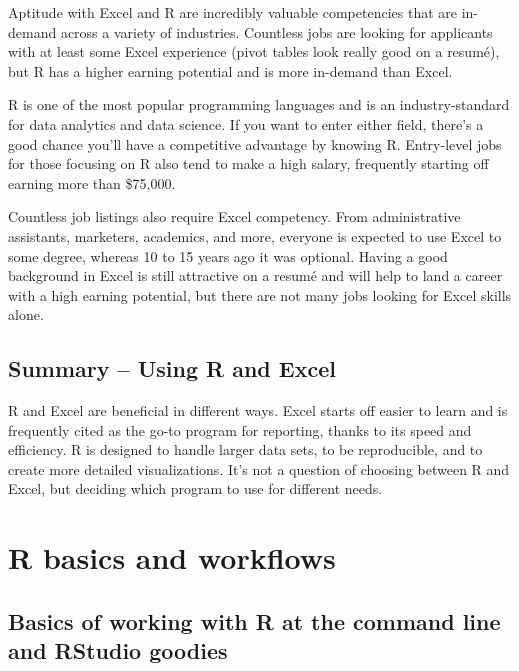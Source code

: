 \documentclass[
]{book}
\begin{document}
Aptitude with Excel and R are incredibly valuable competencies that are in-demand across a variety of industries. Countless jobs are looking for applicants with at least some Excel experience (pivot tables look really good on a resumé), but R has a higher earning potential and is more in-demand than Excel.

R is one of the most popular programming languages and is an industry-standard for data analytics and data science. If you want to enter either field, there's a good chance you'll have a competitive advantage by knowing R. Entry-level jobs for those focusing on R also tend to make a high salary, frequently starting off earning more than \$75,000.

Countless job listings also require Excel competency. From administrative assistants, marketers, academics, and more, everyone is expected to use Excel to some degree, whereas 10 to 15 years ago it was optional. Having a good background in Excel is still attractive on a resumé and will help to land a career with a high earning potential, but there are not many jobs looking for Excel skills alone.

\hypertarget{summary-using-r-and-excel}{%
\section{Summary -- Using R and Excel}\label{summary-using-r-and-excel}}

R and Excel are beneficial in different ways. Excel starts off easier to learn and is frequently cited as the go-to program for reporting, thanks to its speed and efficiency. R is designed to handle larger data sets, to be reproducible, and to create more detailed visualizations. It's not a question of choosing between R and Excel, but deciding which program to use for different needs.

\hypertarget{r-basics}{%
\chapter{R basics and workflows}\label{r-basics}}

\hypertarget{basics-of-working-with-r-at-the-command-line-and-rstudio-goodies}{%
\section{Basics of working with R at the command line and RStudio goodies}\label{basics-of-working-with-r-at-the-command-line-and-rstudio-goodies}}
\end{document}
